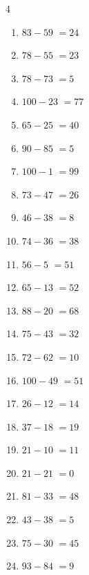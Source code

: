 \begin{multicols}{4}
\begin{enumerate}
  \item $83-59$
        $=24$

  \item $78-55$
        $=23$

  \item $78-73$
        $=5$

  \item $100-23$
        $=77$

  \item $65-25$
        $=40$

  \item $90-85$
        $=5$

  \item $100-1$
        $=99$

  \item $73-47$
        $=26$

  \item $46-38$
        $=8$

  \item $74-36$
        $=38$

  \item $56-5$
        $=51$

  \item $65-13$
        $=52$

  \item $88-20$
        $=68$

  \item $75-43$
        $=32$

  \item $72-62$
        $=10$

  \item $100-49$
        $=51$

  \item $26-12$
        $=14$

  \item $37-18$
        $=19$

  \item $21-10$
        $=11$

  \item $21-21$
        $=0$

  \item $81-33$
        $=48$

  \item $43-38$
        $=5$

  \item $75-30$
        $=45$

  \item $93-84$
        $=9$


\end{enumerate}
\end{multicols}
